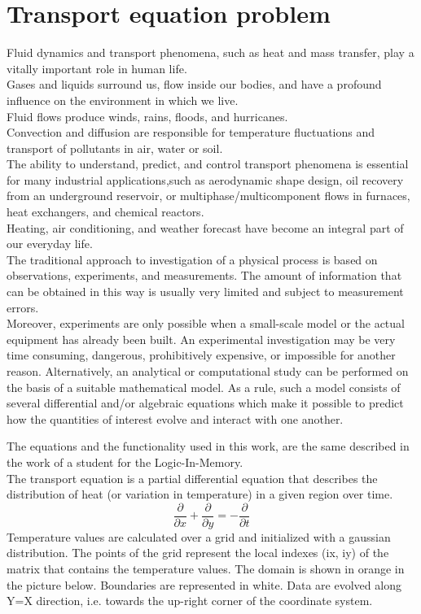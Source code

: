 \chapter{Transport equation problem}
Fluid dynamics and transport phenomena, such as heat and mass transfer, play a vitally important role in human life.\\
Gases and liquids surround us, flow inside our bodies, and have a profound influence on the environment in which we live.\\
 Fluid flows produce winds, rains, floods, and hurricanes.\\ Convection and diffusion are responsible for temperature fluctuations and transport of pollutants in air, water or soil.\\
The ability to understand, predict, and control transport phenomena is essential for many industrial applications,such as aerodynamic shape design, oil recovery from an underground reservoir, or multiphase/multicomponent flows in furnaces, heat exchangers, and chemical reactors. \\Heating, air conditioning, and weather forecast have become an integral part of our everyday life. \\
The traditional approach to investigation of a physical process is based on observations, experiments, and measurements. The amount of information that can be obtained in this way is usually very limited and subject to measurement errors.\\
Moreover, experiments are only possible when a small-scale model or the actual equipment has already been built. An experimental investigation may be very time consuming, dangerous, prohibitively expensive, or impossible for another reason.
Alternatively, an analytical or computational study can be performed on the basis of a suitable mathematical model. As a rule, such a model consists of several differential and/or algebraic equations which make it possible to predict how the quantities of interest evolve and interact with one another.\\
\bigskip

The equations and the functionality used in this work, are the same described in the work of a student for the Logic-In-Memory. \\
The transport equation is a partial differential equation that describes the distribution of heat (or variation in temperature) in a given region over time.
\begin{equation}
	\dfrac{\partial}{\partial x} + \dfrac{\partial}{\partial y} = -\dfrac{\partial}{\partial t}
\end{equation}
Temperature values are calculated over a grid and initialized with a gaussian distribution. The points of the grid represent the local indexes (ix, iy) of the matrix that contains the temperature values. The domain is shown in orange in the picture below. Boundaries are represented in white. Data are evolved along Y=X direction, i.e. towards the up-right corner of the coordinate system.


